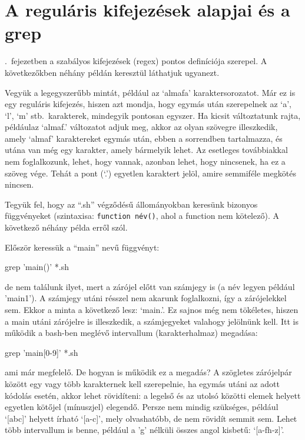 
\section{A reguláris kifejezések alapjai és a grep}

.\ fejezetben a szabályos kifejezések (regex) pontos
definíciója szerepel. A következőkben néhány példán keresztül láthatjuk
ugyanezt.

Vegyük a legegyszerűbb mintát, például az `almafa' karaktersorozatot. Már ez is
egy reguláris kifejezés, hiszen azt mondja, hogy egymás után szerepelnek az `a',
`l', `m' stb.\ karakterek, mindegyik pontosan egyszer. Ha kicsit változtatunk
rajta, példáulaz `almaf.' változatot adjuk meg, akkor az olyan szövegre
illeszkedik, amely `almaf' karaktereket egymás után, ebben a sorrendben
tartalmazza, és utána van még egy karakter, amely bármelyik lehet. Az esetleges
továbbiakkal nem foglalkozunk, lehet, hogy vannak, azonban lehet, hogy
nincsenek, ha ez a szöveg vége. Tehát a pont (`.') egyetlen karaktert jelöl,
amire semmiféle megkötés nincsen.

Tegyük fel, hogy az ``.sh'' végződésű állományokban keresünk bizonyos
függvényeket (szintaxisa: \texttt{function név()}, ahol a function nem
kötelező). A következő néhány példa erről szól.

Először keressük a ``main'' nevű függvényt:

\begin{VerbExample}
grep 'main()' *.sh
\end{VerbExample}

\noindent de nem találunk ilyet, mert a zárójel előtt van számjegy is (a név
legyen például 'main1'). A számjegy utáni
résszel nem akarunk foglalkozni, így a zárójelekkel sem. Ekkor a minta a
következő lesz: `main.'. Ez sajnos még nem tökéletes, hiszen a main utáni
zárójelre is illeszkedik, a számjegyeket valahogy jelölnünk kell. Itt is működik
a bash-ben meglévő intervallum (karakterhalmaz) megadása:

\begin{VerbExample}
grep 'main[0-9]' *.sh
\end{VerbExample}

\noindent ami már megfelelő. De hogyan is működik ez a megadás? A szögletes
zárójelpár
között egy vagy több karakternek kell szerepelnie, ha egymás utáni az adott
kódolás esetén, akkor lehet rövidíteni: a legelső és az utolsó közötti elemek
helyett egyetlen kötőjel (mínuszjel) elegendő. Persze nem mindig szükséges,
például `[abc]' helyett írható `[a-c]', mely olvashatóbb, de nem rövidít semmit
sem. Lehet több intervallum is benne, például a 'g' nélküli összes angol
kisbetű: `[a-fh-z]'.

